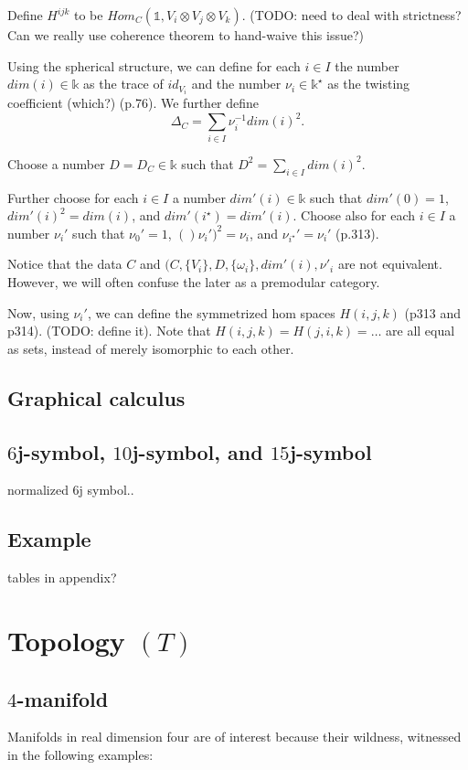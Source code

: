Define $H^{ijk}$ to be
$Hom_{C}(\mathbb{1}, V_{i} \otimes V_{j} \otimes V_{k})$. (TODO:
need to deal with strictness? Can we really use coherence theorem
to hand-waive this issue?)

Using the spherical structure, we can define for each $i \in I$
the number $dim(i) \in \mathbb{k}$ as the trace of $id_{V_{i}}$
and the number $\nu_{i} \in \mathbb{k}^{\star}$ as the twisting
coefficient (which?) (p.76). We further define
$$\Delta_{C} = \sum_{i \in I} \nu_{i}^{-1}dim(i)^{2}.$$

Choose a number $D = D_{C} \in \mathbb{k}$ such that
$D^{2} = \sum_{i \in I} dim(i)^{2}$.

Further choose for each $i \in I$ a number
$dim'(i) \in \mathbb{k}$ such that $dim'(0) = 1$,
$dim'(i)^{2} = dim(i)$, and $dim'(i^{\star}) = dim'(i)$. Choose
also for each $i \in I$ a number $\nu_{i}'$ such that
$\nu_{0}' = 1$, $()\nu_{i}')^{2} = \nu_{i}$, and
$\nu_{i^{\star}}' = \nu_{i}'$ (p.313).

Notice that the data $C$ and
$(C, \{V_{i}\}, D, \{\omega_{i}\}, dim'(i), \nu'_{i}$ are not
equivalent. However, we will often confuse the later as a
premodular category.

Now, using $\nu_{i}'$, we can define the symmetrized hom spaces
$H(i,j,k)$ (p313 and p314). (TODO: define it). Note that
$H(i,j,k)=H(j,i,k)=\ldots$ are all equal as sets, instead of
merely isomorphic to each other.

\subsection{Graphical calculus}
\subsection{$6$j-symbol, $10$j-symbol, and $15$j-symbol}
normalized $6$j symbol..
\subsection{Example}
tables in appendix?

\section{Topology $(T)$}
\subsection{$4$-manifold}
Manifolds in real dimension four are of interest because their
wildness, witnessed in the following examples:

